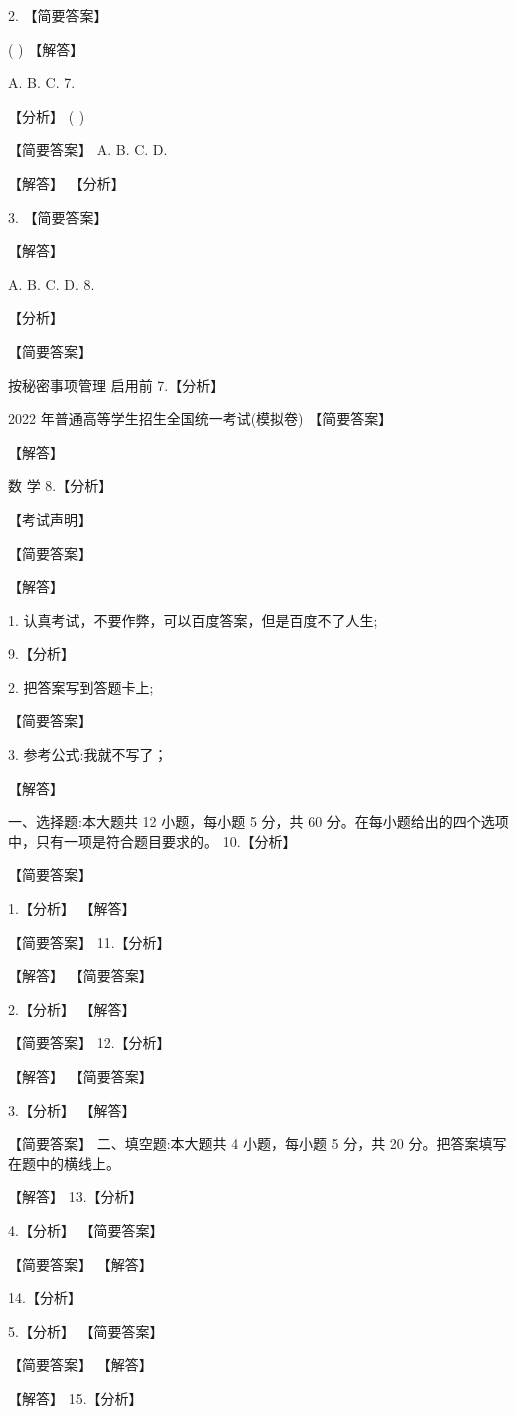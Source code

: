 \documentclass[10pt]{article}
\begin{document}
2. 【简要答案】

( ) 【解答】

A. B. C. 7.

【分析】 ( )

【简要答案】 A. B. C. D.

【解答】 【分析】

3. 【简要答案】

【解答】

A. B. C. D. 8.

【分析】

【简要答案】

按秘密事项管理  启用前 7.【分析】

2022 年普通高等学生招生全国统一考试(模拟卷) 【简要答案】

【解答】

数 学 8.【分析】

【考试声明】

【简要答案】

【解答】

1. 认真考试，不要作弊，可以百度答案，但是百度不了人生;

9.【分析】

2. 把答案写到答题卡上;

【简要答案】

3. 参考公式:我就不写了；

【解答】

一、选择题:本大题共 12 小题，每小题 5 分，共 60 分。在每小题给出的四个选项中，只有一项是符合题目要求的。 10.【分析】

【简要答案】

1.【分析】 【解答】

【简要答案】 11.【分析】

【解答】 【简要答案】

2.【分析】 【解答】

【简要答案】 12.【分析】

【解答】 【简要答案】

3.【分析】 【解答】

【简要答案】 二、填空题:本大题共 4 小题，每小题 5 分，共 20 分。把答案填写在题中的横线上。

【解答】 13.【分析】

4.【分析】 【简要答案】

【简要答案】 【解答】

14.【分析】

5.【分析】 【简要答案】

【简要答案】 【解答】

【解答】 15.【分析】
\end{document}
